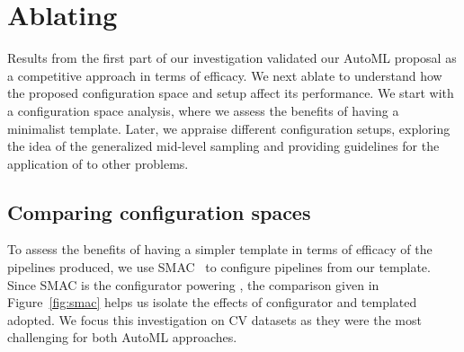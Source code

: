 
\section{Ablating \isklearn}
\label{sec:further}

Results from the first part of our investigation validated our \irace AutoML proposal as a competitive approach in terms of efficacy. We next ablate \isklearn to understand how the proposed configuration space and setup affect its performance. We start with a configuration space analysis,  where we assess the benefits of having a minimalist template. Later, we appraise different configuration setups, exploring the idea of the generalized mid-level sampling and providing guidelines for the application of \isklearn to other problems.


%
\subsection{Comparing configuration spaces}

To assess the benefits of having a simpler template in terms of efficacy of the pipelines produced, we use SMAC~\cite{smac} to configure pipelines from our template. Since SMAC is the configurator powering \autosklearn, the comparison given in Figure~\ref{fig:smac} helps us isolate the effects of configurator and templated adopted. We focus this investigation on CV datasets as they were the most challenging for both AutoML approaches.

